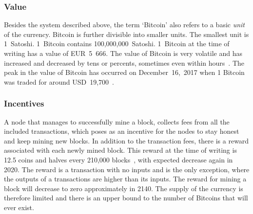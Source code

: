 \subsubsection{Value}
Besides the system described above, the term `Bitcoin' also refers to a basic \textit{unit} of the currency. Bitcoin is further divisible into smaller units. The smallest unit is 1~Satoshi. 1~Bitcoin contains 100,000,000~Satoshi. 1~Bitcoin at the time of writing has a value of EUR~5~666. The value of Bitcoin is very volatile and has increased and decreased by tens or percents, sometimes even within hours~\cite{Adkisson2018WhyVolatile}. The peak in the value of Bitcoin has occurred on December~16,~2017 when 1 Bitcoin was traded for around USD~19,700~\cite{WolfieZhao2017BitcoinHigh}.

\subsubsection{Incentives}\label{sec:incentives}
A node that manages to successfully mine a block, collects fees from all the included transactions, which poses as an incentive for the nodes to stay honest and keep mining new blocks. In addition to the transaction fees, there is a reward associated with each newly mined block. This reward at the time of writing is 12.5 coins and halves every 210,000 blocks~\cite{Judmayer2017BlocksMechanisms}, with expected decrease again in 2020. The reward is a transaction with no inputs and is the only exception, where the outputs of a transactions are higher than its inputs. The reward for mining a block will decrease to zero approximately in 2140. The supply of the currency is therefore limited and there is an upper bound to the number of Bitcoins that will ever exist\footnotemark.


